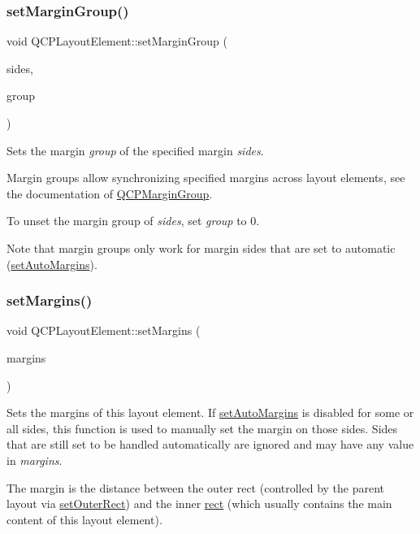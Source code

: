 \subsubsection{\texorpdfstring{set\+Margin\+Group()}{setMarginGroup()}}
{\footnotesize\ttfamily void Q\+C\+P\+Layout\+Element\+::set\+Margin\+Group (\begin{DoxyParamCaption}\item[{Q\+C\+P\+::\+Margin\+Sides}]{sides,  }\item[{\hyperlink{class_q_c_p_margin_group}{Q\+C\+P\+Margin\+Group} $\ast$}]{group }\end{DoxyParamCaption})}

Sets the margin {\itshape group} of the specified margin {\itshape sides}.

Margin groups allow synchronizing specified margins across layout elements, see the documentation of \hyperlink{class_q_c_p_margin_group}{Q\+C\+P\+Margin\+Group}.

To unset the margin group of {\itshape sides}, set {\itshape group} to 0.

Note that margin groups only work for margin sides that are set to automatic (\hyperlink{class_q_c_p_layout_element_accfda49994e3e6d51ed14504abf9d27d}{set\+Auto\+Margins}). \hypertarget{class_q_c_p_layout_element_a8f450b1f3f992ad576fce2c63d8b79cf}{}\label{class_q_c_p_layout_element_a8f450b1f3f992ad576fce2c63d8b79cf} 
\subsubsection{\texorpdfstring{set\+Margins()}{setMargins()}}
{\footnotesize\ttfamily void Q\+C\+P\+Layout\+Element\+::set\+Margins (\begin{DoxyParamCaption}\item[{const Q\+Margins \&}]{margins }\end{DoxyParamCaption})}

Sets the margins of this layout element. If \hyperlink{class_q_c_p_layout_element_accfda49994e3e6d51ed14504abf9d27d}{set\+Auto\+Margins} is disabled for some or all sides, this function is used to manually set the margin on those sides. Sides that are still set to be handled automatically are ignored and may have any value in {\itshape margins}.

The margin is the distance between the outer rect (controlled by the parent layout via \hyperlink{class_q_c_p_layout_element_a38975ea13e36de8e53391ce41d94bc0f}{set\+Outer\+Rect}) and the inner \hyperlink{class_q_c_p_layout_element_a208effccfe2cca4a0eaf9393e60f2dd4}{rect} (which usually contains the main content of this layout element).

